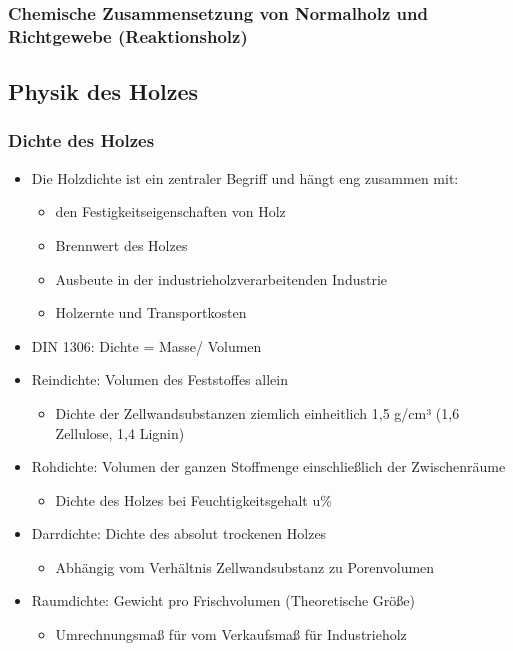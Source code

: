 \documentclass{article}
\begin{document}
\subsubsection{Chemische Zusammensetzung von Normalholz und Richtgewebe
(Reaktionsholz)}

\subsection{Physik des Holzes}
\subsubsection{Dichte des Holzes}
\begin{itemize}
  \item Die Holzdichte ist ein zentraler Begriff und hängt eng  zusammen mit:
  \begin{itemize}
    \item den Festigkeitseigenschaften von Holz 
    \item Brennwert des Holzes
    \item Ausbeute in der industrieholzverarbeitenden Industrie
    \item Holzernte und Transportkosten
  \end{itemize}
  \item DIN 1306: Dichte = Masse/ Volumen
  \item Reindichte: Volumen des Feststoffes allein
  \begin{itemize}
    \item Dichte der Zellwandsubstanzen ziemlich einheitlich 1,5 g/cm³ (1,6
    Zellulose, 1,4 Lignin)
  \end{itemize}
  \item Rohdichte: Volumen der ganzen Stoffmenge einschließlich der
  Zwischenräume
  \begin{itemize}
    \item Dichte des Holzes bei Feuchtigkeitsgehalt u\%
  \end{itemize}
  \item Darrdichte: Dichte des absolut trockenen Holzes
  \begin{itemize}
    \item Abhängig vom Verhältnis Zellwandsubstanz zu Porenvolumen
  \end{itemize}
  \item Raumdichte: Gewicht pro Frischvolumen (Theoretische Größe)
  \begin{itemize}
    \item Umrechnungsmaß für vom Verkaufsmaß für Industrieholz
    \end{itemize}
  \end{itemize}
 
\end{document}
